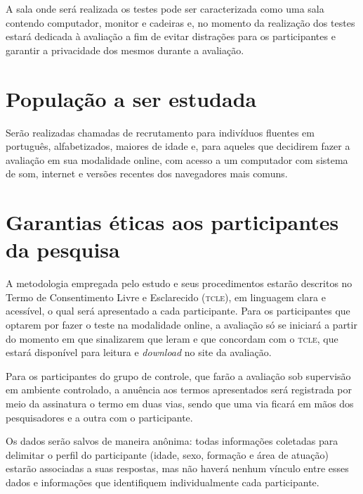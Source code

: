 \documentclass[a4paper,11pt,titlepage,singlespacing]{article}
\begin{document}

A sala onde será realizada os testes pode ser caracterizada como uma sala contendo computador, monitor e cadeiras e, no momento da realização dos testes estará dedicada à avaliação a fim de evitar distrações para os participantes e garantir a privacidade dos mesmos durante a avaliação.

\section{População a ser estudada}

\noindent Serão realizadas chamadas de recrutamento para indivíduos fluentes em português, alfabetizados, maiores de idade e, para aqueles que decidirem fazer a avaliação em sua modalidade online, com acesso a um computador com sistema de som, internet e versões recentes dos navegadores mais comuns.

\section{Garantias éticas aos participantes da pesquisa}
\noindent A metodologia empregada pelo estudo e seus procedimentos estarão descritos no Termo de Consentimento Livre e Esclarecido (\textsc{tcle}), em linguagem clara e acessível, o qual será apresentado a cada participante. Para os participantes que optarem por fazer o teste na modalidade online, a avaliação só se iniciará a partir do momento em que sinalizarem que leram e que concordam com o \textsc{tcle}, que estará disponível para leitura e \textit{download} no site da avaliação. 

Para os participantes do grupo de controle, que farão a avaliação sob supervisão em ambiente controlado, a anuência aos termos apresentados será registrada por meio da assinatura o termo em duas vias, sendo que uma via ficará em mãos dos pesquisadores e a outra com o participante.

Os dados serão salvos de maneira anônima: todas informações coletadas para delimitar o perfil do participante (idade, sexo, formação e área de atuação) estarão associadas a suas respostas, mas não haverá nenhum vínculo entre esses dados e informações que identifiquem individualmente cada participante.
\end{document}
